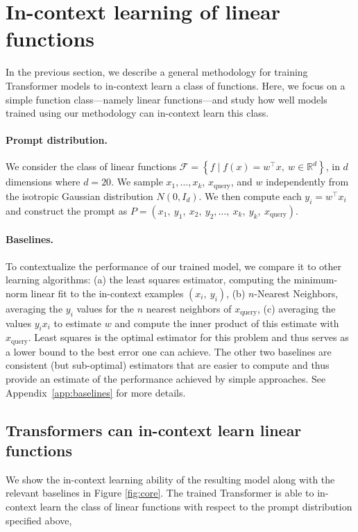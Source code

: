\documentclass{article}
\begin{document}
\section{In-context learning of linear functions}
\label{sec:linear_functions}

In the previous section, we describe a general methodology for training Transformer models to in-context learn a class of functions.
Here, we focus on a simple function class---namely linear functions---and study how well models trained using our methodology can in-context learn this class.

\paragraph{Prompt distribution.}
We consider the class of linear functions $\mathcal{F} = \left\{f \mid  f(x) = w^\top x,\  w\in\mathbb{R}^d\right\}$, in $d$ dimensions where $d=20$.
We sample $x_1, \ldots, x_k$, $x_\text{query}$, and $w$ independently from the isotropic Gaussian distribution $N(0, I_d)$.
We then compute each $y_i=w^\top x_i$ and construct the prompt as $P = (x_1,\ y_1, \ x_2,\ y_2, \ldots,\ x_k,\ y_k,\ x_{\text{query}})$.

\paragraph{Baselines.} To contextualize the performance of our trained model, we compare it to other learning algorithms: 
(a) the least squares estimator, computing the minimum-norm linear fit to the in-context examples $(x_i,\ y_i)$,
(b) $n$-Nearest Neighbors, averaging the $y_i$ values for the $n$ nearest neighbors of $x_{\text{query}}$,
(c) averaging the values $y_ix_i$ to estimate $w$ and compute the inner product of this estimate with $x_\text{query}$.
Least squares is the optimal estimator for this problem and thus serves as a lower bound to the best error one can achieve.
The other two baselines are consistent (but sub-optimal) estimators that are easier to compute and thus provide an estimate of the performance achieved by simple approaches.
See Appendix~\ref{app:baselines} for more details.

\subsection{Transformers can in-context learn linear functions}
\label{sec:linear_functions_1}
We show the in-context learning ability of the resulting model along with the relevant baselines in Figure \ref{fig:core}.
The trained Transformer is able to in-context learn the class of linear functions with respect to the prompt distribution specified above,
\end{document}
